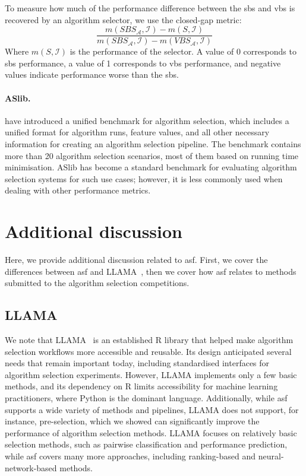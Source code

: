 To measure how much of the performance difference between the \gls{sbs} and \gls{vbs} is recovered by an algorithm selector, we use the closed-gap metric:
$$\frac{m(SBS_\mathcal{A}, \mathcal{I}) - m(S, \mathcal{I})}{m(SBS_\mathcal{A}, \mathcal{I}) - m(VBS_\mathcal{A}, \mathcal{I})}$$
Where $m(S, \mathcal{I})$ is the performance of the selector. A value of 0 corresponds to \gls{sbs} performance, a value of 1 corresponds to \gls{vbs} performance, and negative values indicate performance worse than the \gls{sbs}.

\paragraph{ASlib. } \citet{BisEtAl16} have introduced a unified benchmark for algorithm selection, which includes a unified format for algorithm runs, feature values, and all other necessary information for creating an algorithm selection pipeline. The benchmark contains more than 20 algorithm selection scenarios, most of them based on running time minimisation.
ASlib has become a standard benchmark for evaluating algorithm selection systems for such use cases; however, it is less commonly used when dealing with other performance metrics.

\section{Additional discussion}

Here, we provide additional discussion related to \gls{asf}. First, we cover the differences between \gls{asf} and LLAMA~\citep{Kotthoff13}, then we cover how \gls{asf} relates to methods submitted to the algorithm selection competitions.
\subsection{LLAMA}
\label{sec:llama}
We note that LLAMA~\citep{Kotthoff13} is an established R library that helped make algorithm selection workflows more accessible and reusable. Its design anticipated several needs that remain important today, including standardised interfaces for algorithm selection experiments. However, LLAMA implements only a few basic methods, and its dependency on R limits accessibility for machine learning practitioners, where Python is the dominant language.
Additionally, while \gls{asf} supports a wide variety of methods and pipelines, LLAMA does not support, for instance, pre-selection, which we showed can significantly improve the performance of algorithm selection methods. LLAMA focuses on relatively basic selection methods, such as pairwise classification and performance prediction, while \gls{asf} covers many more approaches, including ranking-based and neural-network-based methods.

